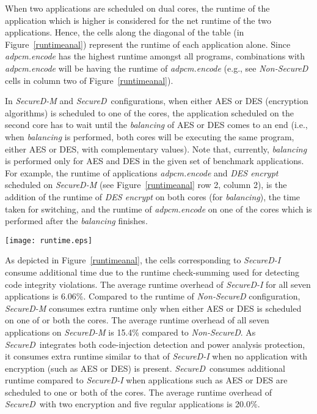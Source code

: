 \documentclass{article}
\newcommand{\SecureD}{\emph{SecureD}}
\begin{document}
When two applications are scheduled on dual cores, the runtime of the
application which is higher is considered for the net runtime      of
the  two  applications.  Hence,  the  cells along the diagonal of the
table (in Figure~\ref{runtimeanal}) represent   the  runtime  of each
application alone.           Since  \emph{adpcm.encode}       has the
highest runtime amongst all            programs,    combinations with
\emph{adpcm.encode} will be having the runtime of \emph{adpcm.encode}
(e.g., see \emph{Non-SecureD} cells  in               column two   of 
Figure~\ref{runtimeanal}). 

In \emph{SecureD\nobreakdash-M} and \SecureD\ configurations, when either AES  or
DES (encryption algorithms) is scheduled to one of the cores,     the
application scheduled   on      the second core has to wait until the 
\emph{balancing} of  AES   or         DES comes to an end (i.e., when
\emph{balancing} is performed, both cores  will be executing the same
program, either AES or DES, with complementary values).   Note  that,
currently, \emph{balancing} is performed only for AES and DES in  the
given  set     of benchmark applications. For example, the runtime of 
applications \emph{adpcm.encode} and \emph{DES encrypt} scheduled  on
\emph{SecureD\nobreakdash-M} (see Figure~\ref{runtimeanal} row 2, column 2),   is
the    addition    of the runtime of \emph{DES encrypt} on both cores
(for \emph{balancing}), the time taken for switching, and the runtime
of \emph{adpcm.encode} on one   of the cores which is performed after
the \emph{balancing} finishes.

\begin{figure*}[ht!]
\centering
\texttt{[image: runtime.eps]}
\vspace{1mm}
\caption{Runtime Comparisons}
\label{runtimeanal}
\end{figure*}

As depicted in Figure~\ref{runtimeanal}, the cells corresponding   to
\emph{SecureD\nobreakdash-I} consume additional time due to the runtime   check-summing used for detecting code integrity violations.     The average
runtime  overhead  of \emph{SecureD\nobreakdash-I} for all  seven applications is
6.06\%. Compared to the runtime of \emph{Non-SecureD}  configuration,
\emph{SecureD\nobreakdash-M} consumes extra runtime only when either AES or   DES
is  scheduled on one of or both the cores. The   average      runtime
overhead of all seven applications on \emph{SecureD\nobreakdash-M} is      15.4\%
compared to \emph{Non-SecureD}. As \SecureD\ integrates          both 
code-injection detection and power analysis protection, it   consumes
extra runtime similar to that of \emph{SecureD\nobreakdash-I} when no application
with  encryption (such as AES or DES) is present. \SecureD\  consumes
additional  runtime compared to \emph{SecureD\nobreakdash-I} when    applications 
such as AES or DES are scheduled to one or both of the     cores. The
average runtime    overhead of \SecureD\ with two encryption and five
regular applications is 20.0\%.
\end{document}
